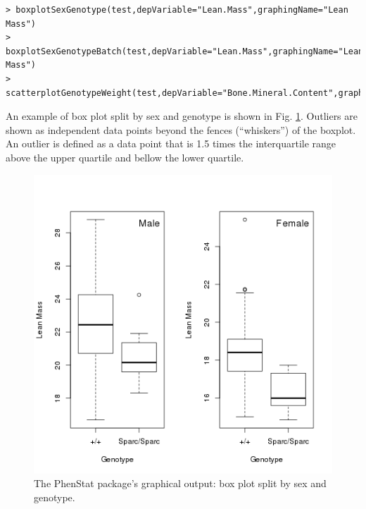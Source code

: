 \documentclass[12pt,a4paper]{article}
\begin{document}
\begingroup
    \fontsize{8pt}{12pt}\selectfont
\begin{verbatim}
> boxplotSexGenotype(test,depVariable="Lean.Mass",graphingName="Lean Mass")
> boxplotSexGenotypeBatch(test,depVariable="Lean.Mass",graphingName="Lean Mass")
> scatterplotGenotypeWeight(test,depVariable="Bone.Mineral.Content",graphingName="BMC")
\end{verbatim}
\endgroup 


An example of box plot split by sex and genotype is shown in Fig. \ref{fig:07}. Outliers are shown as independent data points beyond the fences (``whiskers'') of the boxplot. An outlier is defined as a data point that is 1.5 times the interquartile range above the upper quartile and bellow the lower quartile.
\begin{figure}[!htpb]%
\centerline{\includegraphics[scale=0.5]{boxplotSexGenotype.png}}
\caption{The PhenStat package's graphical output: box plot split by sex and genotype.}\label{fig:07}
\end{figure}
\end{document}
